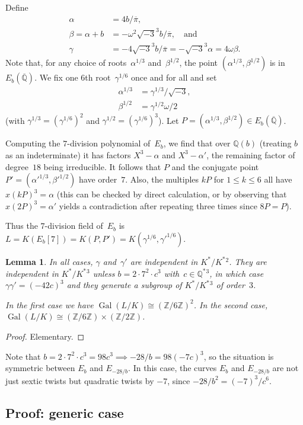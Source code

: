 \documentclass[12pt]{amsart}
\newcommand{\Q}{\mathbb{Q}}
\newcommand{\Z}{\mathbb{Z}}
\newcommand{\Qbar}{{\overline{\Q}}}
\DeclareMathOperator{\Gal}{Gal}
\def\w{\omega}
\def\r3{\sqrt{-3}}
\def\pibar{\overline{\pi}}
\numberwithin{equation}{section}
\newtheorem{lemma}[theorem]{Lemma}
\theoremstyle{definition}
\theoremstyle{remark}
\begin{document}
Define
\begin{align}
\alpha&=4b/\pibar,\\
\beta=\alpha+b&=-\w^2\r3^3b/\pibar,\quad\text{and}\\
\gamma&=-4\r3^3b/\pibar = -\r3^3\alpha = 4\w\beta.
\end{align}
Note that, for any choice of roots~$\alpha^{1/3}$ and~$\beta^{1/2}$, the point $(\alpha^{1/3},\beta^{1/2})$ is 
in~$E_b(\Qbar)$.  We fix one $6$th 
root~$\gamma^{1/6}$ once and for all
and set
\begin{align}
\alpha^{1/3} &= \gamma^{1/3}/\r3,\\
\beta^{1/2} &= \gamma^{1/2}\w/2
\end{align}
(with $\gamma^{1/3}=(\gamma^{1/6})^2$ and $\gamma^{1/2}=(\gamma^{1/6})^3$).  Let
$P=(\alpha^{1/3},\beta^{1/2})\in E_b(\Qbar)$.

Computing the $7$-division polynomial of~$E_b$, we find that over
$\Q(b)$ (treating $b$ as an indeterminate) it has factors $X^3-\alpha$
and $X^3-\alpha'$, the remaining factor of degree~$18$ being
irreducible.  It follows that $P$ and the conjugate point
$P'=(\alpha'^{1/3},\beta'^{1/2})$ have order~$7$.  Also, the multiples
$kP$ for $1\le k\le6$ all have $x(kP)^3=\alpha$ (this can be checked
by direct calculation, or by observing that $x(2P)^3=\alpha'$ yields a
contradiction after repeating three times since $8P=P$).

Thus the $7$-division field of~$E_b$ is
$L=K(E_b[7])=K(P,P')=K(\gamma^{1/6},\gamma'^{1/6})$.

\begin{lemma}In all cases, $\gamma$ and~$\gamma'$ are independent in
  $K^*/K^*{}^2$.  They are independent in $K^*/K^*{}^3$ unless
  $b=2\cdot7^2\cdot c^3$ with~$c\in\Q^*{}^3$, in which case
  $\gamma\gamma'=(-42c)^3$ and they generate a subgroup of $K^*/K^*{}^3$
  of order~$3$.

In the first case we have $\Gal(L/K)\cong(\Z/6\Z)^2$.  In the second
case, $\Gal(L/K)\cong(\Z/6\Z)\times(\Z/2\Z)$.
\end{lemma}
\begin{proof}
Elementary.
\end{proof}
Note that $b=2\cdot7^2\cdot c^3 = 98c^3\implies -28/b=98(-7c)^3$, so the situation is
symmetric between $E_b$ and $E_{-28/b}$.  In this case, the curves
$E_b$ and $E_{-28/b}$ are not just sextic twists but quadratic twists
by $-7$, since $-28/b^2=(-7)^3/c^6$.

\subsection{Proof: generic case}
\end{document}

